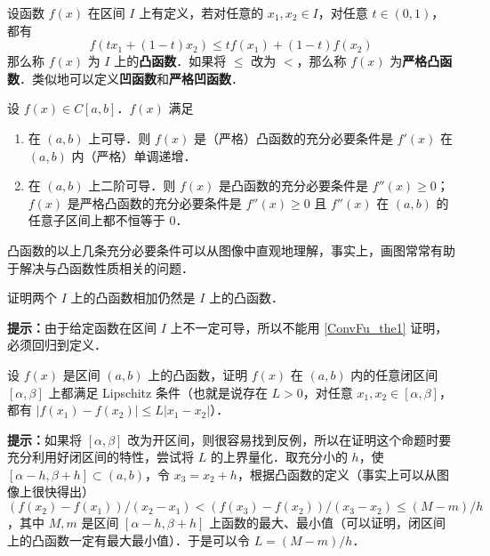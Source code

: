 

设函数 $f(x)$ 在区间 $I$ 上有定义，若对任意的 $x_1,x_2\in I$，对任意 $t\in (0,1)$，都有
\begin{equation}
f(tx_1+(1-t)x_2)\le tf(x_1)+(1-t)f(x_2)
\end{equation}
那么称 $f(x)$ 为 $I$ 上的\textbf{凸函数}．如果将 $\le$ 改为 $<$，那么称 $f(x)$ 为\textbf{严格凸函数}．类似地可以定义\textbf{凹函数}和\textbf{严格凹函数}．
\begin{theorem}{}\label{ConvFu_the1}
设 $f(x)\in C[a,b]$．$f(x)$ 满足
\begin{enumerate}
\item 在 $(a,b)$ 上可导．则 $f(x)$ 是（严格）凸函数的充分必要条件是 $f'(x)$ 在 $(a,b)$ 内（严格）单调递增．
\item 在 $(a,b)$ 上二阶可导．则 $f(x)$ 是凸函数的充分必要条件是 $f''(x)\ge 0$；$f(x)$ 是严格凸函数的充分必要条件是 $f''(x)\ge 0$ 且 $f''(x)$ 在 $(a,b)$ 的任意子区间上都不恒等于 $0$．
\end{enumerate}
\end{theorem}
凸函数的以上几条充分必要条件可以从图像中直观地理解，事实上，画图常常有助于解决与凸函数性质相关的问题．
\begin{exercise}{}
证明两个 $I$ 上的凸函数相加仍然是 $I$ 上的凸函数．

\textbf{提示：}由于给定函数在区间 $I$ 上不一定可导，所以不能用  
\autoref{ConvFu_the1} 证明，必须回归到定义．
\end{exercise}
\begin{exercise}{}
设 $f(x)$ 是区间 $(a,b)$ 上的凸函数，证明 $f(x)$ 在 $(a,b)$ 内的任意闭区间 $[\alpha,\beta]$ 上都满足 Lipschitz 条件（也就是说存在 $L>0$，对任意 $x_1,x_2\in [\alpha,\beta]$，都有 $|f(x_1)-f(x_2)|\le L|x_1-x_2|$）．

\textbf{提示：}如果将 $[\alpha,\beta]$ 改为开区间，则很容易找到反例，所以在证明这个命题时要充分利用好闭区间的特性，尝试将 $L$ 的上界量化．取充分小的 $h$，使 $[\alpha-h,\beta+h]\subset (a,b)$，令 $x_3=x_2+h$，根据凸函数的定义（事实上可以从图像上很快得出）$(f(x_2)-f(x_1))/(x_2-x_1)<(f(x_3)-f(x_2))/(x_3-x_2)\le (M-m)/h$，其中 $M,m$ 是区间 $[\alpha-h,\beta+h]$ 上函数的最大、最小值（可以证明，闭区间上的凸函数一定有最大最小值）．于是可以令 $L=(M-m)/h$．
\end{exercise}

